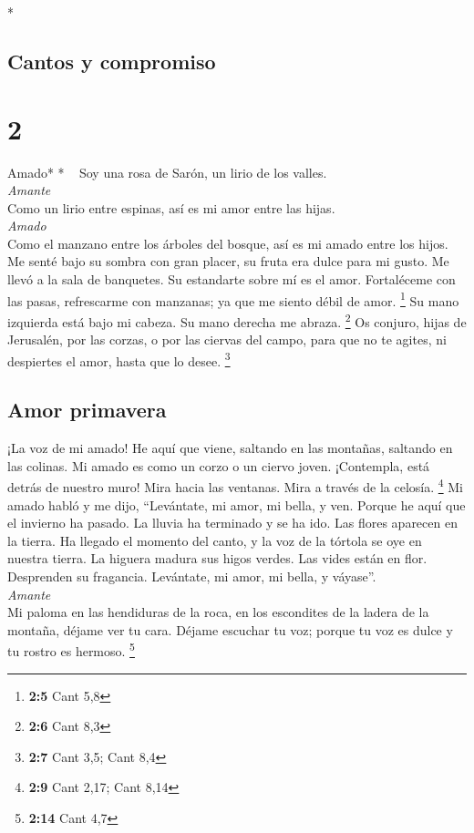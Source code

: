 \begin{paracol}{2}
\begin{otherlanguage}{english}
\end{otherlanguage}

\switchcolumn[0]*

\hypertarget{cantos-y-compromiso}{%
\subsection{Cantos y compromiso}\label{cantos-y-compromiso}}

\hypertarget{section-2}{%
\section{2}\label{section-2}}

\emph{\hfill\break
}Amado* * ~ Soy una rosa de Sarón, un lirio de los
valles.\\
\emph{Amante}\\
 Como un lirio entre espinas, así es mi amor entre las
hijas.\\
\emph{Amado}\\
 Como el manzano entre los árboles del bosque, así es mi
amado entre los hijos. Me senté bajo su sombra con gran placer, su fruta
era dulce para mi gusto.  Me llevó a la sala de banquetes.
Su estandarte sobre mí es el amor.  Fortaléceme con las
pasas, refrescarme con manzanas; ya que me siento débil de amor.
\footnote{\textbf{2:5} Cant 5,8}  Su mano izquierda está
bajo mi cabeza. Su mano derecha me abraza. \footnote{\textbf{2:6} Cant
  8,3}  Os conjuro, hijas de Jerusalén, por las corzas, o
por las ciervas del campo, para que no te agites, ni despiertes el amor,
hasta que lo desee. \footnote{\textbf{2:7} Cant 3,5; Cant 8,4}

\hypertarget{amor-primavera}{%
\subsection{Amor primavera}\label{amor-primavera}}

 ¡La voz de mi amado! He aquí que viene, saltando en las
montañas, saltando en las colinas.  Mi amado es como un
corzo o un ciervo joven. ¡Contempla, está detrás de nuestro muro! Mira
hacia las ventanas. Mira a través de la celosía. \footnote{\textbf{2:9}
  Cant 2,17; Cant 8,14}  Mi amado habló y me dijo,
``Levántate, mi amor, mi bella, y ven.  Porque he aquí
que el invierno ha pasado. La lluvia ha terminado y se ha ido.
 Las flores aparecen en la tierra. Ha llegado el momento
del canto, y la voz de la tórtola se oye en nuestra tierra.
 La higuera madura sus higos verdes. Las vides están en
flor. Desprenden su fragancia. Levántate, mi amor, mi bella, y
váyase''.\\
\emph{Amante}\\
 Mi paloma en las hendiduras de la roca, en los
escondites de la ladera de la montaña, déjame ver tu cara. Déjame
escuchar tu voz; porque tu voz es dulce y tu rostro es hermoso.
\footnote{\textbf{2:14} Cant 4,7}


\end{paracol}
